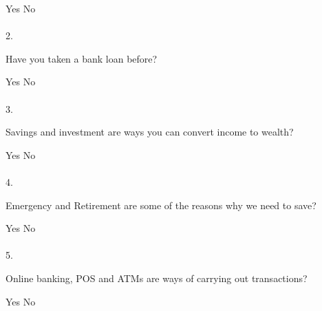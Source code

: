 \documentclass[a5paper]{sdapsclassic}
\begin{document}
\begin{questionnaire}
{		\break
		\hspace{25pt}\textcolor{black}{\mycheckbox{}{}}Yes\hspace{8pt}%
		\textcolor{black}{\mycheckbox{}{}}No%
		\\
		\\
		2.\hspace{6pt}\begin{minipage}{29em}Have you taken a bank loan before? \end{minipage}
		\break
		\hspace{25pt}\textcolor{black}{\mycheckbox{}{}}Yes\hspace{8pt}%
		\textcolor{black}{\mycheckbox{}{}}No%
		\\
		\\
		3.\hspace{6pt}\begin{minipage}{40em}Savings and investment are ways you can convert income to wealth? \end{minipage}\break
		\hspace{25pt}\textcolor{black}{\mycheckbox{}{}}Yes\hspace{8pt}%
		\textcolor{black}{\mycheckbox{}{}}No%
		\\
		\\
		4.\hspace{6pt}\begin{minipage}{40em}Emergency and Retirement are some of the reasons why we need to save? \end{minipage}\break
		\hspace{25pt}\textcolor{black}{\mycheckbox{}{}}Yes\hspace{8pt}%
		\textcolor{black}{\mycheckbox{}{}}No%
		\\
		\\
		5.\hspace{6pt}\begin{minipage}{40em}Online banking, POS and ATMs are ways of carrying out transactions? \end{minipage}\break
		\hspace{25pt}\textcolor{black}{\mycheckbox{}{}}Yes\hspace{8pt}%
		\textcolor{black}{\mycheckbox{}{}}No%
}
\end{questionnaire}
\end{document}
